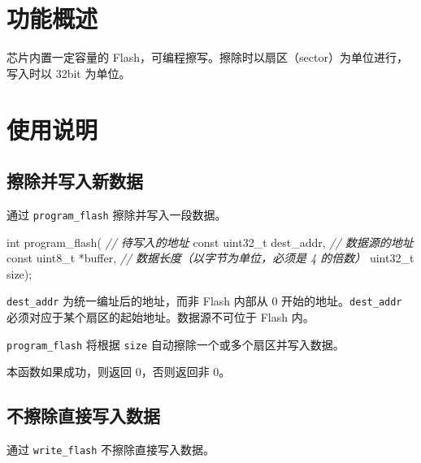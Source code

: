 \documentclass[
  12pt,
]{book}
\newenvironment{Shaded}{\begin{snugshade}}{\end{snugshade}}
\newcommand{\CommentTok}[1]{\textcolor[rgb]{0.56,0.35,0.01}{\textit{#1}}}
\newcommand{\DataTypeTok}[1]{\textcolor[rgb]{0.13,0.29,0.53}{#1}}
\newcommand{\NormalTok}[1]{#1}
\begin{document}
\hypertarget{ux529fux80fdux6982ux8ff0-10}{%
\section{功能概述}\label{ux529fux80fdux6982ux8ff0-10}}

芯片内置一定容量的 Flash，可编程擦写。擦除时以扇区（sector）为单位进行，
写入时以 32bit 为单位。

\hypertarget{ux4f7fux7528ux8bf4ux660e-11}{%
\section{使用说明}\label{ux4f7fux7528ux8bf4ux660e-11}}

\hypertarget{ux64e6ux9664ux5e76ux5199ux5165ux65b0ux6570ux636e}{%
\subsection{擦除并写入新数据}\label{ux64e6ux9664ux5e76ux5199ux5165ux65b0ux6570ux636e}}

通过 \texttt{program\_flash} 擦除并写入一段数据。

\begin{Shaded}
\begin{Highlighting}[]
\DataTypeTok{int}\NormalTok{ program_flash(}
    \CommentTok{// 待写入的地址}
    \DataTypeTok{const} \DataTypeTok{uint32_t}\NormalTok{ dest_addr,}
    \CommentTok{// 数据源的地址}
    \DataTypeTok{const} \DataTypeTok{uint8_t}\NormalTok{ *buffer,}
    \CommentTok{// 数据长度（以字节为单位，必须是 4 的倍数）}
    \DataTypeTok{uint32_t}\NormalTok{ size);}
\end{Highlighting}
\end{Shaded}

\texttt{dest\_addr} 为统一编址后的地址，而非 Flash 内部从 0 开始的地址。\texttt{dest\_addr}
必须对应于某个扇区的起始地址。数据源不可位于 Flash 内。

\texttt{program\_flash} 将根据 \texttt{size} 自动擦除一个或多个扇区并写入数据。

本函数如果成功，则返回 0，否则返回非 0。

\hypertarget{ux4e0dux64e6ux9664ux76f4ux63a5ux5199ux5165ux6570ux636e}{%
\subsection{不擦除直接写入数据}\label{ux4e0dux64e6ux9664ux76f4ux63a5ux5199ux5165ux6570ux636e}}

通过 \texttt{write\_flash} 不擦除直接写入数据。
\end{document}
